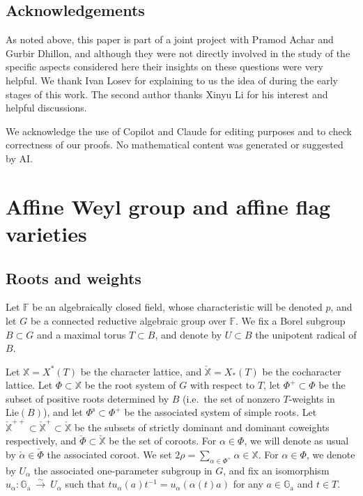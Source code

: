 \documentclass[11pt]{amsart}
\numberwithin{equation}{section}
\theoremstyle{plain}
\theoremstyle{definition}
\newcommand{\F}{{\mathbb F}}
\newcommand{\X}{{\mathbb X}}
\newcommand{\Xd}{\check{\X}}
\newcommand{\xs}{{\ \xrightarrow{\sim}\ }}
\newcommand{\Ga}{{\mathbb{G}_{\mathrm{a}}}}
\newcommand{\Phis}{\Phi^{\mathrm{s}}}
\begin{document}
\subsection{Acknowledgements}

As noted above, this paper is part of a joint project with Pramod Achar and Gurbir Dhillon, and although they were not directly involved in the study of the specific aspects considered here their insights on these questions were very helpful. 
We thank Ivan Losev for explaining to us the idea of \cite{bez-losev} during the early stages of this work. 
The second author thanks Xinyu Li for his interest and helpful discussions. 

We acknowledge the use of Copilot and Claude for editing purposes and to check correctness of our proofs. No mathematical content was generated or suggested by AI.

\section{Affine Weyl group and affine flag varieties} 
\label{sec:Wext}

\subsection{Roots and weights} 
\label{ss:roots-weights}

Let $\F$ be an algebraically closed field, whose characteristic will be denoted $p$, and let $G$ be a connected reductive algebraic group over $\F$. 
We fix a Borel subgroup $B\subset G$ and a maximal torus $T\subset B$, and denote by $U\subset B$ the unipotent radical of $B$. 

Let $\X=X^*(T)$ be the character lattice, and $\Xd=X_*(T)$ be the cocharacter lattice. 
Let $\Phi \subset \X$ be the root system of $G$ with respect to $T$, let $\Phi^+\subset \Phi$ be the subset of positive roots determined by $B$ (i.e.~the set of nonzero $T$-weights in $\mathrm{Lie}(B)$), and let $\Phis \subset \Phi^+$ be the associated system of simple roots.
Let $\Xd^{++}\subset \Xd^+ \subset \Xd$ be the subsets of strictly dominant and dominant coweights respectively, and $\check{\Phi} \subset \Xd$ be the set of coroots. 
For $\alpha \in \Phi$, we will denote as usual by $\check{\alpha} \in \check{\Phi}$ the associated coroot. 
We set $2\rho=\sum_{\alpha\in \Phi^+} \alpha \in \X$.
For $\alpha\in \Phi$, we denote by $U_\alpha$ the associated one-parameter subgroup in $G$, and fix an isomorphism $u_\alpha:\Ga\xs U_\alpha$ such that $t u_\alpha(a) t^{-1} = u_\alpha(\alpha(t) a)$ for any $a \in \Ga$ and $t \in T$. 
\end{document}
